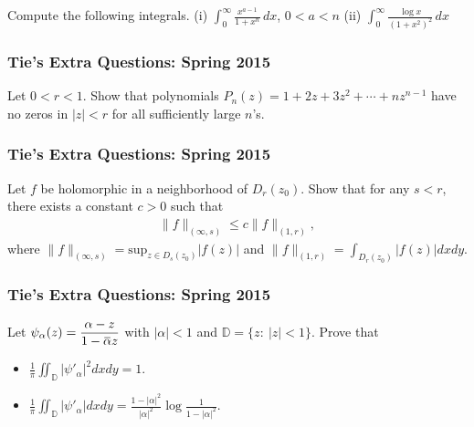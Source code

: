 Compute the following integrals. (i)
\(\displaystyle \int_0^\infty \frac{x^{a-1}}{1 + x^n} \, dx\),
\(0< a < n\) (ii)
\(\displaystyle \int_0^\infty \frac{\log x}{(1 + x^2)^2}\, dx\)

\hypertarget{ties-extra-questions-spring-2015-26}{%
\subsubsection{Tie's Extra Questions: Spring
2015}\label{ties-extra-questions-spring-2015-26}}

Let \(0<r<1\). Show that polynomials
\(P_n(z) = 1 + 2z + 3 z^2 + \cdots + n z^{n-1}\) have no zeros in
\(|z|<r\) for all sufficiently large \(n\)'s.

\hypertarget{ties-extra-questions-spring-2015-27}{%
\subsubsection{Tie's Extra Questions: Spring
2015}\label{ties-extra-questions-spring-2015-27}}

Let \(f\) be holomorphic in a neighborhood of \(D_r(z_0)\). Show that
for any \(s<r\), there exists a constant \(c>0\) such that
\begin{align*}\|f\|_{(\infty, s)} \leq c \|f\|_{(1, r)},\end{align*}
where
\(\displaystyle \|f\|_{(\infty, s)} = \text{sup}_{z \in D_s(z_0)}|f(z)|\)
and \(\displaystyle \|f\|_{(1, r)} = \int_{D_r(z_0)} |f(z)|dx dy\).

\hypertarget{ties-extra-questions-spring-2015-28}{%
\subsubsection{Tie's Extra Questions: Spring
2015}\label{ties-extra-questions-spring-2015-28}}

Let
\(\displaystyle{\psi_{\alpha}(z)=\frac{\alpha-z}{1-\mkern 1.5mu\overline{\mkern-1.5mu\alpha\mkern-1.5mu}\mkern 1.5muz}}\)
with \(|\alpha|<1\) and \({\mathbb D}=\{z:\ |z|<1\}\). Prove that

\begin{itemize}
\item
  \(\displaystyle{\frac{1}{\pi}\iint_{{\mathbb D}} |\psi'_{\alpha}|^2 dx dy =1}\).
\item
  \(\displaystyle{\frac{1}{\pi}\iint_{{\mathbb D}} |\psi'_{\alpha}| dx dy =\frac{1-|\alpha|^2}{|\alpha|^2} \log \frac{1}{1-|\alpha|^2}}\).
\end{itemize}

